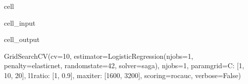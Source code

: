 \documentclass[letterpaper,10pt,english]{jupyterBook}
\begin{document}
\begin{sphinxuseclass}{cell}
\begin{sphinxVerbatimInput}
\begin{sphinxuseclass}{cell_input}
\end{sphinxuseclass}\end{sphinxVerbatimInput}
\begin{sphinxVerbatimOutput}

\begin{sphinxuseclass}{cell_output}
\begin{sphinxVerbatim}[commandchars=\\\{\}]
GridSearchCV(cv=10,
             estimator=LogisticRegression(n\PYGZus{}jobs=\PYGZhy{}1, penalty=\PYGZsq{}elasticnet\PYGZsq{},
                                          random\PYGZus{}state=42, solver=\PYGZsq{}saga\PYGZsq{}),
             n\PYGZus{}jobs=\PYGZhy{}1,
             param\PYGZus{}grid=\PYGZob{}\PYGZsq{}C\PYGZsq{}: [1, 10, 20], \PYGZsq{}l1\PYGZus{}ratio\PYGZsq{}: [1, 0.9],
                         \PYGZsq{}max\PYGZus{}iter\PYGZsq{}: [1600, 3200]\PYGZcb{},
             scoring=\PYGZsq{}roc\PYGZus{}auc\PYGZsq{}, verbose=False)
\end{sphinxVerbatim}

\end{sphinxuseclass}\end{sphinxVerbatimOutput}

\end{sphinxuseclass}
\end{document}
